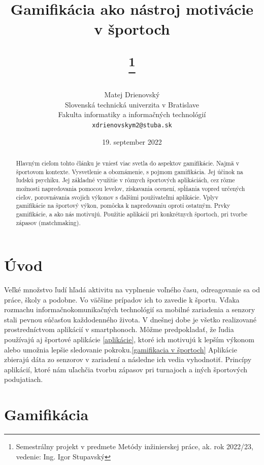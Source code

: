 \documentclass[10pt,twoside,slovak,a4paper]{article}
\title{Gamifikácia ako nástroj motivácie v športoch

\author{Matej Drienovský\\[2pt]
	{\small Slovenská technická univerzita v Bratislave}\\
	{\small Fakulta informatiky a informačných technológií}\\
	{\small \texttt{xdrienovskym2@stuba.sk}}
	}

\date{\small 19. september 2022}
\thanks{Semestrálny projekt v predmete Metódy inžinierskej práce, ak. rok 2022/23, vedenie: Ing. Igor Stupavský}}
\begin{document}
\maketitle

\begin{abstract}

Hlavným cieľom tohto článku je vniesť viac svetla do aspektov
gamifikácie. Najmä
v športovom kontexte. Vysvetlenie a oboznámenie, s pojmom gamifikácia. Jej účinok na
ľudskú psychiku. Jej základné využitie v rôznych športových aplikáciách, cez rôzne možnosti
napredovania pomocou levelov, získavania ocenení, spĺňania vopred určených cieľov,
porovnávania svojich výkonov s ďalšími použivateľmi aplikácie. Vplyv gamifikácie na športový
výkon, pomôcka k napredovaniu oproti ostatným. Prvky gamifikácie, a ako nás motivujú. Použitie aplikácií pri konkrétnych športoch, pri tvorbe zápasov
(matchmaking).
\end{abstract}


\section{Úvod}
Veľké množstvo ľudí hľadá aktivitu na vyplnenie voľného času, odreagovanie sa od práce, školy a podobne. Vo väčšine prípadov ich to zavedie k športu. 
Vďaka rozmachu informačnokomunikačných technológií sa mobilné zariadenia a senzory stali pevnou súčasťou každodenného života.
V dnešnej dobe je všetko realizované prostredníctvom aplikácií v smartphonoch. 
Môžme predpokladať, že ľudia používajú aj športové aplikácie \ref{aplikácie}, ktoré ich motivujú k lepším výkonom alebo umožnia lepšie sledovanie pokroku.\ref{gamifikacia v športoch} Aplikácie zbierajú dáta zo senzorov v zariadení a následne ich vedia vyhodnotiť.
Princípy aplikácií, ktoré nám uľachčia tvorbu zápasov pri turnajoch a iných športových podujatiach.\cite{Effect_of_gamification-Framework}


\section{Gamifikácia} \label{gamifikácia}
\end{document}
